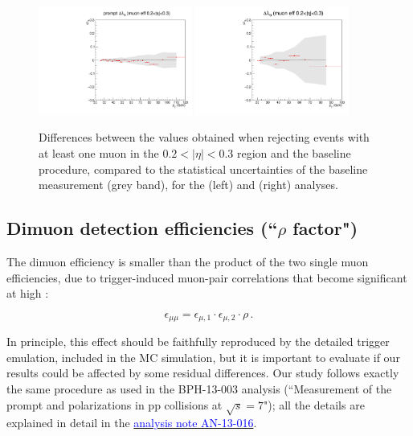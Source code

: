 \begin{figure}[h]
\centering
\includegraphics[width=0.45\textwidth]{Figures/chapter6/lth_absDiff_eta-jpsi.pdf}
\includegraphics[width=0.45\textwidth]{Figures/chapter6/lth_absDiff_eta-psip.pdf}
\caption{Differences between the \lth values obtained when rejecting events with
at least one muon in the $0.2 < |\eta| < 0.3$ region and the baseline procedure, 
compared to the statistical uncertainties of the baseline measurement (grey band), 
for the \jpsi (left) and \psip (right) analyses.}
\label{fig:single_mu_eff_eta}
\end{figure}

\vfill\newpage

\subsection{Dimuon detection efficiencies (``$\rho$ factor")}

The dimuon efficiency is smaller than the product of the two single muon efficiencies, 
due to trigger-induced muon-pair correlations that become significant at high \pt:

\begin{equation}
\epsilon_{\mu\mu}=\epsilon_{\mu,1}\cdot\epsilon_{\mu,2}\cdot\rho \, .
\end{equation}

In principle, this effect should be faithfully reproduced by the detailed trigger emulation,
included in the MC simulation, but it is important to evaluate if our results could be affected
by some residual differences.
%
Our study follows exactly the same procedure as used in the BPH-13-003 analysis
(``Measurement of the prompt \jpsi and \psip polarizations in pp collisions at $\sqrt{s} = 7$\TeV");
all the details are explained in detail in the 
\href{https://cms.cern.ch/iCMS/jsp/db_notes/noteInfo.jsp?cmsnoteid=CMS\%20AN-2013/016}{\textcolor{blue}{analysis note AN-13-016}}.

